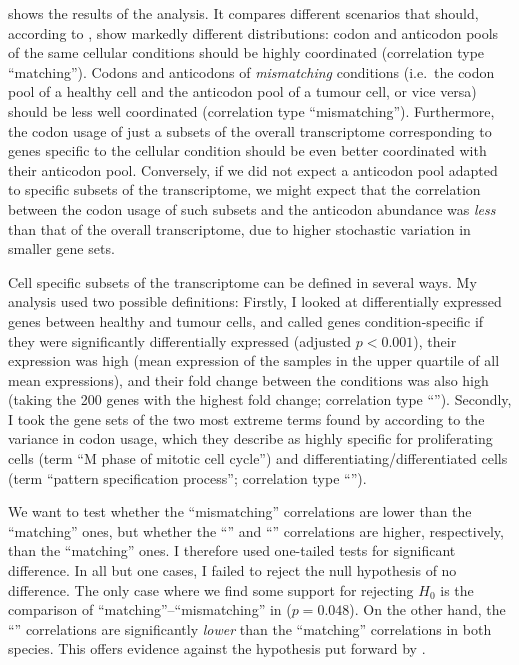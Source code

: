  shows the results of the analysis. It compares different
scenarios that should, according to \cite{Gingold:2014}, show markedly different
distributions: codon and anticodon pools of the same cellular conditions should
be highly coordinated (correlation type “matching”). Codons and anticodons of
\emph{mismatching} conditions (i.e.\ the codon pool of a healthy cell and the
anticodon pool of a tumour cell, or vice versa) should be less well coordinated
(correlation type “mismatching”). Furthermore, the codon usage of just a subsets
of the overall transcriptome corresponding to genes specific to the cellular
condition should be even better coordinated with their anticodon pool.
Conversely, if we did not expect a \trna anticodon pool adapted to specific
subsets of the transcriptome, we might expect that the correlation between the
codon usage of such subsets and the anticodon abundance was \emph{less} than
that of the overall transcriptome, due to higher stochastic variation in smaller
gene sets.

Cell specific subsets of the transcriptome can be defined in several ways. My
analysis used two possible definitions: Firstly, I looked at differentially
expressed genes between healthy and tumour cells, and called genes
condition-specific if they were significantly differentially expressed (adjusted
\(p < 0.001\)), their expression was high (mean expression of the samples in the
upper quartile of all mean expressions), and their fold change between the
conditions was also high (taking the \num{200} genes with the highest fold
change; correlation type “”). Secondly, I took the gene sets of the two
most extreme \go terms found by \citet{Gingold:2014} according to the variance
in codon usage, which they describe as highly specific for proliferating cells
(\go term “M phase of mitotic cell cycle”) and differentiating/differentiated
cells (\go term “pattern specification process”; correlation type “”).

We want to test whether the “mismatching” correlations are lower than the
“matching” ones, but whether the “” and “” correlations are
higher, respectively, than the “matching” ones. I therefore used one-tailed
tests for significant difference. In all but one cases, I failed to reject the
null hypothesis of no difference. The only case where we find some support for
rejecting \(H_0\) is the comparison of “matching”--“mismatching” in \hsa (\(p =
0.048\)). On the other hand, the “” correlations are significantly
\emph{lower} than the “matching” correlations in both species. This offers
evidence against the hypothesis put forward by \citet{Gingold:2014}.

